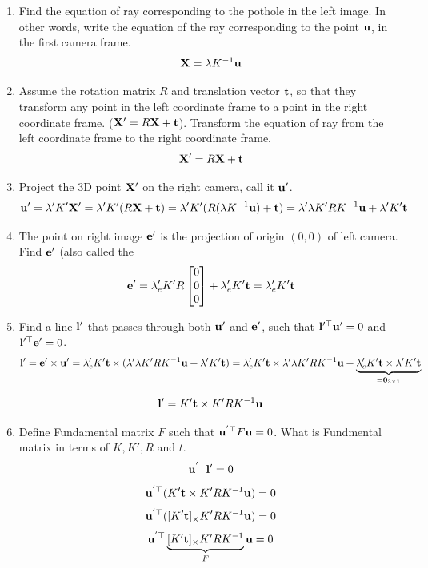 \documentclass[times,singlecolumn]{article}
\begin{document}
\begin{enumerate}
\item Find the equation of ray corresponding to the pothole in the left image.
  In other words, write the equation of the ray corresponding to the point
  $\mathbf{u}$, in the first camera frame.
  \\
  \[ \mathbf{X} = \lambda K^{-1} \mathbf{u} \]

\item Assume the rotation matrix $R$ and translation vector $\mathbf{t}$, so
  that they transform any point in the left coordinate frame to a point in the
  right coordinate frame. ($\mathbf{X}' = R \mathbf{X}+ \mathbf{t}$). Transform the equation of
  ray from the left coordinate frame to the right coordinate frame.
  \\
  \[ \mathbf{X}' = R \mathbf{X} + \mathbf{t} \]

\item Project the 3D point $\mathbf{X}'$ on the  right camera, call it $\mathbf{u}'$.
  \\
  \[ \mathbf{u}' = \lambda' K'\mathbf{X}' = \lambda' K' (R \mathbf{X} + \mathbf{t}) = \lambda' K'
    (R(\lambda K^{-1} \mathbf{u})  + \mathbf{t}) = \lambda' \lambda K' R K^{-1} \mathbf{u} +
    \lambda' K' \mathbf{t} \]


\item The point on right image $\mathbf{e}'$ is the projection of origin $(0, 0)$ of left
  camera. Find $\mathbf{e}'$ (also called the 
  \[
    \mathbf{e}' = \lambda'_e K' R \begin{bmatrix} 0 \\ 0 \\ 0\end{bmatrix} +
    \lambda'_e K' \mathbf{t} = \lambda'_e K' \mathbf{t}
    \]

\item Find a line $\mathbf{l}'$ that passes through both $\mathbf{u}'$ and $\mathbf{e}'$, such
  that $\mathbf{l}'^\top \mathbf{u}' = 0$ and $\mathbf{l}'^\top \mathbf{e}' = 0$.
  \[
    \mathbf{l}' = \mathbf{e}' \times \mathbf{u}'  = \lambda'_e K' \mathbf{t} \times 
    (\lambda' \lambda K' R K^{-1} \mathbf{u} +
    \lambda' K' \mathbf{t})
    = \lambda'_e K' \mathbf{t} \times 
    \lambda' \lambda K' R K^{-1} \mathbf{u} + \underbrace{\lambda'_e K' \mathbf{t} \times
      \lambda' K' \mathbf{t}}_{ = \mathbf{0}_{3\times 1}}
    \]

    \[ \mathbf{l}' = K' \mathbf{t} \times K' R K^{-1}\mathbf{u}\] 

  \item Define Fundamental matrix $F$ such that $\mathbf{u}^{'\top} F\mathbf{u} = 0$. What is
    Fundmental matrix in terms of $K, K', R$ and $t$.
    \[ \mathbf{u}^{'\top} \mathbf{l}' = 0\]
    \[ \mathbf{u}^{'\top} (K' \mathbf{t} \times K' R K^{-1}\mathbf{u})  = 0\]
    \[ \mathbf{u}^{'\top} ([K' \mathbf{t}]_{\times} K' R K^{-1}\mathbf{u})  = 0\]
    \[ \mathbf{u}^{'\top} \underbrace{[K' \mathbf{t}]_{\times} K' R K^{-1} }_{F} \mathbf{u}  = 0\]


\end{enumerate}
\end{document}
